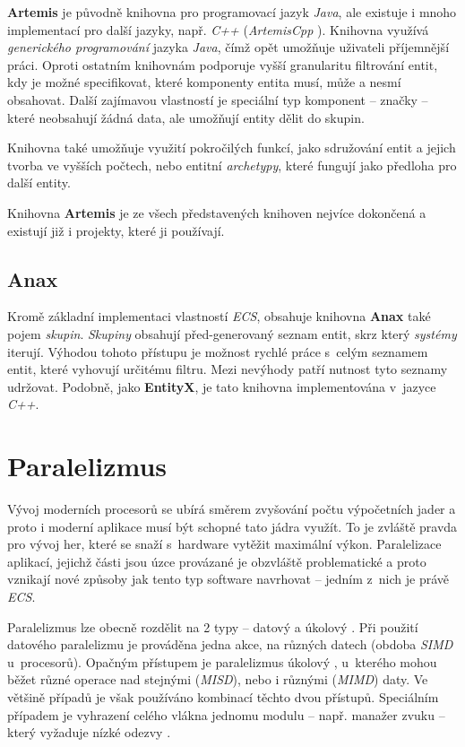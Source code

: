 \textbf{Artemis} \cite{ArtemisJava} je původně knihovna pro programovací jazyk \emph{Java}, ale existuje i mnoho implementací pro další jazyky, např. \emph{C++} (\emph{ArtemisCpp} \cite{ArtemisCpp}). Knihovna využívá \emph{generického programování} jazyka \emph{Java}, čímž opět umožňuje uživateli příjemnější práci. Oproti ostatním knihovnám podporuje vyšší granularitu filtrování entit, kdy je možné specifikovat, které komponenty entita musí, může a nesmí obsahovat. Další zajímavou vlastností je speciální typ komponent -- značky -- které neobsahují žádná data, ale umožňují entity dělit do skupin. 

Knihovna také umožňuje využití pokročilých funkcí, jako sdružování entit a jejich tvorba ve vyšších počtech, nebo entitní \emph{archetypy}, které fungují jako předloha pro další entity.

Knihovna \textbf{Artemis} je ze všech představených knihoven nejvíce dokončená a existují již i projekty, které ji používají.

\subsection{Anax}

Kromě základní implementaci vlastností \emph{ECS}, obsahuje knihovna \textbf{Anax} \cite{Anax} také pojem \emph{skupin}. \emph{Skupiny} obsahují před-generovaný seznam entit, skrz který \emph{systémy} iterují. Výhodou tohoto přístupu je možnost rychlé práce s~celým seznamem entit, které vyhovují určitému filtru. Mezi nevýhody patří nutnost tyto seznamy udržovat. Podobně, jako \textbf{EntityX}, je tato knihovna implementována v~jazyce \emph{C++}. 

\section{Paralelizmus}
\label{Chap:Parallelism}

Vývoj moderních procesorů se ubírá směrem zvyšování počtu výpočetních jader \cite{CPUPerfHistory} a proto i moderní aplikace musí být schopné tato jádra využít. To je zvláště pravda pro vývoj her, které se snaží s~hardware vytěžit maximální výkon. Paralelizace aplikací, jejichž části jsou úzce provázané je obzvláště problematické a proto vznikají nové způsoby jak tento typ software navrhovat -- jedním z~nich je právě \emph{ECS}. 

Paralelizmus lze obecně rozdělit na 2 typy -- datový a úkolový \cite{KindsOfParallelism}. Při použití datového paralelizmu je prováděna jedna akce, na různých datech (obdoba \emph{SIMD} u~procesorů). Opačným přístupem je paralelizmus úkolový \cite{TaskBasedParallelism}, u~kterého mohou běžet různé operace nad stejnými (\emph{MISD}), nebo i různými (\emph{MIMD}) daty. Ve většině případů je však používáno kombinací těchto dvou přístupů. Speciálním případem je vyhrazení celého vlákna jednomu modulu -- např. manažer zvuku -- který vyžaduje nízké odezvy \cite{FrontierThreads}.

